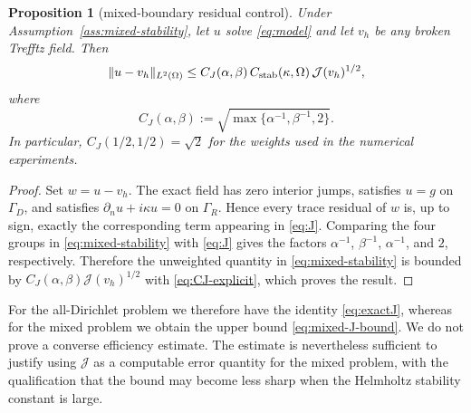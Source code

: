 \documentclass[pdflatex,sn-mathphys-num]{sn-jnl}
\theoremstyle{thmstyleone}
\newtheorem{proposition}[theorem]{Proposition}
\theoremstyle{thmstyletwo}
\begin{document}
\begin{proposition}[mixed-boundary residual control]\label{prop:mixed-control}
Under Assumption~\ref{ass:mixed-stability}, let $u$ solve \eqref{eq:model} and let $v_h$ be any broken Trefftz field.  Then
\begin{equation}\label{eq:mixed-J-bound}
 {\|u-v_h\|_{L^2(\Omega)}\le C_J(\alpha,\beta)\,
 C_{\rm stab}(\kappa,\Omega)\,\mathcal J(v_h)^{1/2},}
\end{equation}
where
\begin{equation}\label{eq:CJ-explicit}
 C_J(\alpha,\beta)
 :=\sqrt{\max\{\alpha^{-1},\beta^{-1},2\}}.
\end{equation}
In particular, $C_J(1/2,1/2)=\sqrt2$ for the weights used in the numerical experiments.
\end{proposition}
\begin{proof}
Set $w=u-v_h$.  The exact field has zero interior jumps, satisfies $u=g$ on $\Gamma_D$, and satisfies $\partial_nu+i\kappa u=0$ on $\Gamma_R$.  Hence every trace residual of $w$ is, up to sign, exactly the corresponding term appearing in \eqref{eq:J}.  Comparing the four groups in \eqref{eq:mixed-stability} with \eqref{eq:J} gives the factors $\alpha^{-1}$, $\beta^{-1}$, $\alpha^{-1}$, and $2$, respectively.  Therefore the unweighted quantity in \eqref{eq:mixed-stability} is bounded by $C_J(\alpha,\beta)\mathcal J(v_h)^{1/2}$ with \eqref{eq:CJ-explicit}, which proves the result.
\end{proof}

For the all-Dirichlet problem we therefore have the identity \eqref{eq:exactJ}, whereas for the mixed problem we obtain the upper bound \eqref{eq:mixed-J-bound}.  We do not prove a converse efficiency estimate.  The estimate is nevertheless sufficient to justify using $\mathcal J$ as a computable error quantity for the mixed problem, with the qualification that the bound may become less sharp when the Helmholtz stability constant is large.
\end{document}
